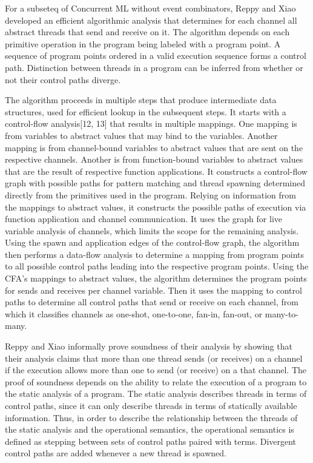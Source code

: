 \documentclass{article}
\begin{document}
For a subseteq of Concurrent ML without event combinators, Reppy and  Xiao developed an
efficient algorithmic analysis that determines for each channel all abstract threads that send
and receive on it.  The algorithm depends on each primitive operation in the program being
labeled with a program point.  A sequence of program points ordered in a valid execution
sequence forms a control path.  Distinction between threads in a program can be inferred from
whether or not their control paths diverge.  

The algorithm proceeds in multiple steps that produce intermediate data structures, used for
efficient lookup in the subsequent steps.  It starts with a control-flow analysis[12, 13] that
results in multiple mappings. One mapping is from variables to abstract values that may bind to
the variables.  Another mapping is from channel-bound variables to abstract values that are
sent on the respective channels.  Another is from function-bound variables to abstract values
that are the result of respective function applications.  It constructs a control-flow graph 
with possible paths for pattern matching and thread spawning determined directly from the
primitives used in the program.  Relying on information from the mappings to abstract values,
it constructs the possible paths of execution via function application and channel
communication.  It uses the graph for live variable analysis of channels, which limits the
scope for the remaining analysis.  Using the spawn and application edges of the control-flow
graph, the algorithm then performs a data-flow analysis to determine a mapping from program
points to all possible control paths leading into the respective program points.  Using the
CFA's mappings to abstract values, the algorithm determines the program points for sends and
receives per channel variable.  Then it uses the mapping to control paths to determine all
control paths that send or receive on each channel, from which it classifies channels as
one-shot, one-to-one, fan-in, fan-out, or many-to-many.

Reppy and Xiao informally prove soundness of their analysis by showing that their analysis
claims that more than one thread sends (or receives) on a channel if the execution allows more
than one to send (or receive) on a that channel.  The proof of soundness depends on the
ability to relate the execution of a program to the static analysis of a program.  The static
analysis describes threads in terms of control paths, since it can only describe threads in
terms of statically available information. Thus, in order to describe the relationship between
the threads of the static analysis and the operational semantics, the operational semantics is
defined as stepping between sets of control paths paired with terms.  Divergent control paths
are added whenever a new thread is spawned.
\end{document}
